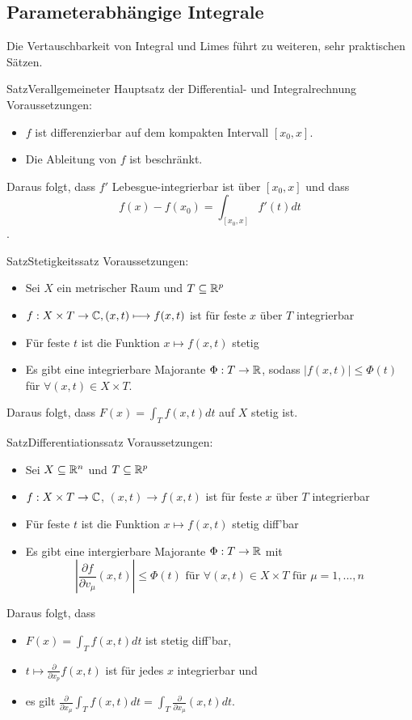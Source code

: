 \subsection{Parameterabhängige Integrale}
Die Vertauschbarkeit von Integral und Limes führt zu weiteren, sehr praktischen Sätzen.
\begin{Satz}{Satz}{Verallgemeineter Hauptsatz der Differential- und Integralrechnung}
Voraussetzungen:
\begin{itemize}
    \item $f$ ist differenzierbar auf dem kompakten Intervall $[x_0, x]$.
    \item Die Ableitung von $f$ ist beschränkt.
\end{itemize}
Daraus folgt, dass $f'$ Lebesgue-integrierbar ist über $[x_0, x]$ und dass $$f(x)-f(x_0)=\int_{[x_0, x]} f'(t)dt$$.
\end{Satz}
\begin{Satz}{Satz}{Stetigkeitssatz}
    Voraussetzungen:
    \begin{itemize}
        \item Sei $X$ ein metrischer Raum und $T\subseteq \mathbb{R}^p$
        \item $f:X\times T\rightarrow \mathbb{C}, (x,t)\longmapsto f(x,t)$ ist für feste $x$ über $T$ integrierbar
        \item Für feste $t$ ist die Funktion $x\longmapsto f(x,t)$ stetig
        \item Es gibt eine integrierbare Majorante $\Phi: T\rightarrow \mathbb{R}$, sodass $|f(x,t)|\leq \Phi(t)$ für $\forall (x,t)\in X\times T$.
    \end{itemize}
    Daraus folgt, dass $F(x)=\int_T f(x,t)dt$ auf $X$ stetig ist.
\end{Satz}
\begin{Satz}{Satz}{Differentiationssatz}
        Voraussetzungen:
    \begin{itemize}
        \item Sei $X\subseteq \mathbb{R}^n$ und $T\subseteq \mathbb{R}^p$
        \item $f: X\times T\rightarrow \mathbb{C}$, $(x,t)\rightarrow f(x,t)$ ist für feste $x$ über $T$ integrierbar
        \item Für feste $t$ ist die Funktion $x\longmapsto f(x,t)$ stetig diff'bar
        \item Es gibt eine intergierbare Majorante $\Phi:T\rightarrow \mathbb{R}$ mit
        $$|\frac{\partial f}{\partial v_\mu}(x,t)|\leq \Phi(t)\mbox{ für }\forall (x,t)\in X\times T\mbox{ für }\mu = 1,...,n$$
    \end{itemize}
    Daraus folgt, dass
    \begin{itemize}
        \item $F(x)=\int_T f(x,t)dt$ ist stetig diff'bar,
        \item $t\mapsto\frac{\partial}{\partial x_p}f(x,t)$ ist für jedes $x$ integrierbar und
        \item es gilt $\frac{\partial}{\partial x_\mu}\int_T f(x,t)dt=\int_T \frac{\partial}{\partial x_\mu} (x,t) dt$.
    \end{itemize}
\end{Satz}
